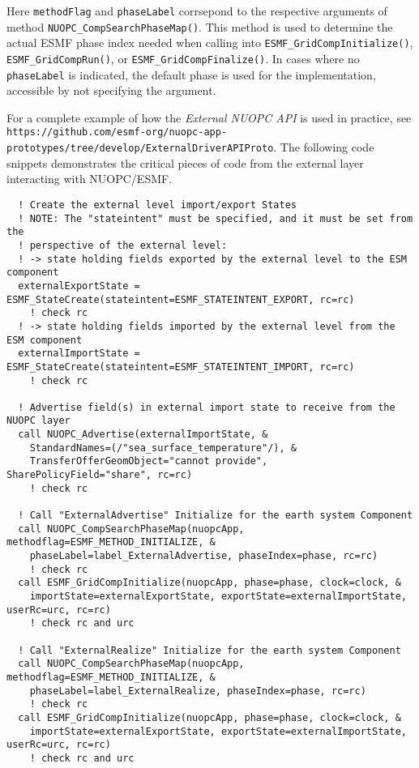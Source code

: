 Here {\tt methodFlag} and {\tt phaseLabel} corrsepond to the respective arguments of method {\tt NUOPC\_CompSearchPhaseMap()}. This method is used to determine the actual ESMF phase index needed when calling into {\tt ESMF\_GridCompInitialize()}, {\tt ESMF\_GridCompRun()}, or {\tt ESMF\_GridCompFinalize()}. In cases where no {\tt phaseLabel} is indicated, the default phase is used for the implementation, accessible by not specifying the argument.

For a complete example of how the {\em External NUOPC API} is used in practice, see {\tt\small https://github.com/esmf-org/nuopc-app-prototypes/tree/develop/ExternalDriverAPIProto}. The following code snippets demonstrates the critical pieces of code from the external layer interacting with NUOPC/ESMF.

\begin{verbatim}
  ! Create the external level import/export States
  ! NOTE: The "stateintent" must be specified, and it must be set from the
  ! perspective of the external level:
  ! -> state holding fields exported by the external level to the ESM component
  externalExportState = ESMF_StateCreate(stateintent=ESMF_STATEINTENT_EXPORT, rc=rc)
    ! check rc
  ! -> state holding fields imported by the external level from the ESM component
  externalImportState = ESMF_StateCreate(stateintent=ESMF_STATEINTENT_IMPORT, rc=rc)
    ! check rc

  ! Advertise field(s) in external import state to receive from the NUOPC layer
  call NUOPC_Advertise(externalImportState, &
    StandardNames=(/"sea_surface_temperature"/), &
    TransferOfferGeomObject="cannot provide", SharePolicyField="share", rc=rc)
    ! check rc

  ! Call "ExternalAdvertise" Initialize for the earth system Component
  call NUOPC_CompSearchPhaseMap(nuopcApp, methodflag=ESMF_METHOD_INITIALIZE, &
    phaseLabel=label_ExternalAdvertise, phaseIndex=phase, rc=rc)
    ! check rc
  call ESMF_GridCompInitialize(nuopcApp, phase=phase, clock=clock, &
    importState=externalExportState, exportState=externalImportState, userRc=urc, rc=rc)
    ! check rc and urc

  ! Call "ExternalRealize" Initialize for the earth system Component
  call NUOPC_CompSearchPhaseMap(nuopcApp, methodflag=ESMF_METHOD_INITIALIZE, &
    phaseLabel=label_ExternalRealize, phaseIndex=phase, rc=rc)
    ! check rc
  call ESMF_GridCompInitialize(nuopcApp, phase=phase, clock=clock, &
    importState=externalExportState, exportState=externalImportState, userRc=urc, rc=rc)
    ! check rc and urc


\end{verbatim}
